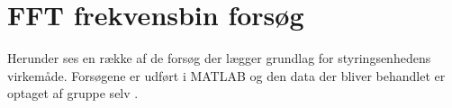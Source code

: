 \section{FFT frekvensbin forsøg}


Herunder ses en række af de forsøg der lægger grundlag for styringsenhedens virkemåde. 
Forsøgene er udført i MATLAB og den data der bliver behandlet er optaget af gruppe selv
.